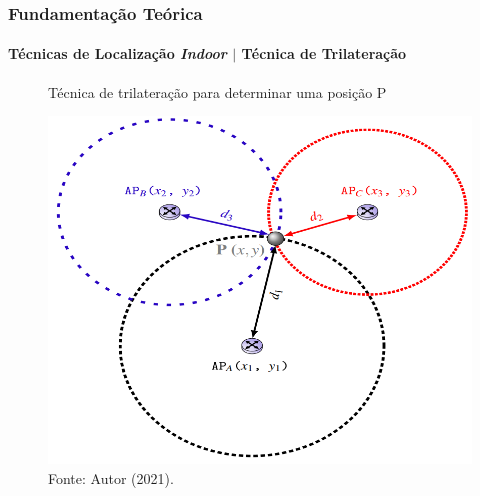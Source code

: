 \documentclass[xcolor={dvipsnames,svgnames,table}]{beamer}
\begin{document}

	\begin{frame}
		\frametitle{Fundamentação Teórica}
		\framesubtitle{Técnicas de Localização \textit{Indoor} $|$ Técnica de Trilateração}
		
		\begin{figure}
			\caption{Técnica de trilateração para determinar uma posição P}
			\vspace{-5pt}
			\centering
			\includegraphics[width=0.65\linewidth]{imgs/trilateracao.PNG}
			\vspace{-5pt}
			\caption*{\tiny{Fonte: Autor (2021).}}
		\end{figure}	
	\end{frame}
\end{document}
